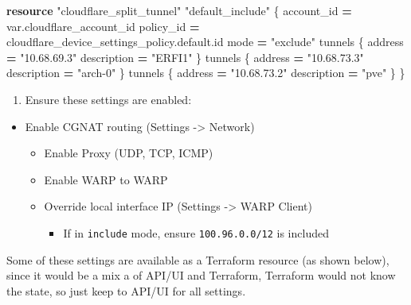 \documentclass[
]{article}
\newenvironment{Shaded}{\begin{snugshade}}{\end{snugshade}}
\newcommand{\KeywordTok}[1]{\textcolor[rgb]{0.13,0.29,0.53}{\textbf{#1}}}
\newcommand{\NormalTok}[1]{#1}
\newcommand{\OperatorTok}[1]{\textcolor[rgb]{0.81,0.36,0.00}{\textbf{#1}}}
\newcommand{\StringTok}[1]{\textcolor[rgb]{0.31,0.60,0.02}{#1}}
\newcommand{\VariableTok}[1]{\textcolor[rgb]{0.00,0.00,0.00}{#1}}
\providecommand{\tightlist}{%
  \setlength{\itemsep}{0pt}\setlength{\parskip}{0pt}}\usepackage{longtable,booktabs,array}
\begin{document}
\begin{Shaded}
\begin{Highlighting}[numbers=left,,]
\KeywordTok{resource} \StringTok{"cloudflare\_split\_tunnel"} \StringTok{"default\_include"}\NormalTok{ \{}
\NormalTok{  account\_id }\OperatorTok{=} \VariableTok{var}\NormalTok{.cloudflare\_account\_id}
\NormalTok{  policy\_id  }\OperatorTok{=}\NormalTok{ cloudflare\_device\_settings\_policy.default.id}
\NormalTok{  mode       }\OperatorTok{=} \StringTok{"exclude"}
\NormalTok{  tunnels \{}
\NormalTok{    address     }\OperatorTok{=} \StringTok{"10.68.69.3"}
\NormalTok{    description }\OperatorTok{=} \StringTok{"ERFI1"}
\NormalTok{  \}}
\NormalTok{  tunnels \{}
\NormalTok{    address     }\OperatorTok{=} \StringTok{"10.68.73.3"}
\NormalTok{    description }\OperatorTok{=} \StringTok{"arch{-}0"}
\NormalTok{  \}}
\NormalTok{  tunnels \{}
\NormalTok{    address     }\OperatorTok{=} \StringTok{"10.68.73.2"}
\NormalTok{    description }\OperatorTok{=} \StringTok{"pve"}
\NormalTok{  \}}
\NormalTok{\}}
\end{Highlighting}
\end{Shaded}

\newpage{}

\begin{enumerate}
\def\labelenumi{\arabic{enumi}.}
\setcounter{enumi}{2}
\tightlist
\item
  Ensure these settings are enabled:
\end{enumerate}

\begin{itemize}
\tightlist
\item
  Enable CGNAT routing (Settings -\textgreater{} Network)

  \begin{itemize}
  \tightlist
  \item
    Enable Proxy (UDP, TCP, ICMP)
  \item
    Enable WARP to WARP
  \item
    Override local interface IP (Settings -\textgreater{} WARP Client)

    \begin{itemize}
    \tightlist
    \item
      If in \texttt{include} mode, ensure \texttt{100.96.0.0/12} is
      included
    \end{itemize}
  \end{itemize}
\end{itemize}

Some of these settings are available as a Terraform resource (as shown
below), since it would be a mix a of API/UI and Terraform, Terraform
would not know the state, so just keep to API/UI for all settings.
\end{document}
